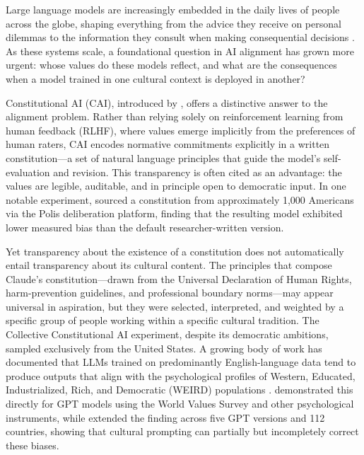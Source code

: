 \documentclass{article}
\begin{document}
Large language models are increasingly embedded in the daily lives of people across the globe, shaping everything from the advice they receive on personal dilemmas to the information they consult when making consequential decisions \citep{bender2021dangers, weidinger2022taxonomy}. As these systems scale, a foundational question in AI alignment has grown more urgent: whose values do these models reflect, and what are the consequences when a model trained in one cultural context is deployed in another?

Constitutional AI (CAI), introduced by \citet{bai2022constitutional}, offers a distinctive answer to the alignment problem. Rather than relying solely on reinforcement learning from human feedback (RLHF), where values emerge implicitly from the preferences of human raters, CAI encodes normative commitments explicitly in a written constitution---a set of natural language principles that guide the model's self-evaluation and revision. This transparency is often cited as an advantage: the values are legible, auditable, and in principle open to democratic input. In one notable experiment, \citet{huang2024collective} sourced a constitution from approximately 1,000 Americans via the Polis deliberation platform, finding that the resulting model exhibited lower measured bias than the default researcher-written version.

Yet transparency about the existence of a constitution does not automatically entail transparency about its cultural content. The principles that compose Claude's constitution---drawn from the Universal Declaration of Human Rights, harm-prevention guidelines, and professional boundary norms---may appear universal in aspiration, but they were selected, interpreted, and weighted by a specific group of people working within a specific cultural tradition. The Collective Constitutional AI experiment, despite its democratic ambitions, sampled exclusively from the United States. A growing body of work has documented that LLMs trained on predominantly English-language data tend to produce outputs that align with the psychological profiles of Western, Educated, Industrialized, Rich, and Democratic (WEIRD) populations \citep{henrich2010weirdest}. \citet{atari2023which} demonstrated this directly for GPT models using the World Values Survey and other psychological instruments, while \citet{tao2024cultural} extended the finding across five GPT versions and 112 countries, showing that cultural prompting can partially but incompletely correct these biases.
\end{document}
